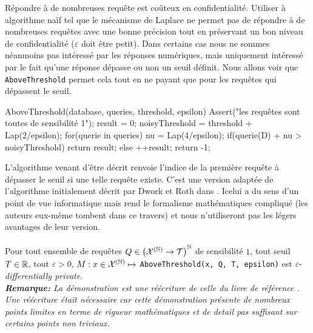 Répondre à de nombreuses requête est coûteux en confidentialité. Utiliser à algorithme naïf tel que le mécanisme de {\sc Laplace} \cite{10.1007/11681878_14} ne permet pas de répondre à de nombreuses requêtes avec une bonne précision tout en préservant un bon niveau de confidentialité (\(\varepsilon\) doit être petit). Dans certains cas nous ne sommes néanmoins pas intéressé par les réponses numériques, mais uniquement intéressé par le fait qu'une réponse dépasse ou non un seuil définit. Nous allons voir que \texttt{AboveThreshold} \cite{dwork2014the} permet cela tout en ne payant que pour les requêtes qui dépassent le seuil.

\label{AboveThreshold}
\begin{code}
    AboveThreshold(database, queries, threshold, epsilon){
        Assert("les requêtes sont toutes de sensibilité 1");
        result = 0;
        noisyThreshold = threshold + Lap(2/epsilon);
        for(querie in queries){
            nu = Lap(4/epsilon);
            if(querie(D) + nu > noisyThreshold)
                return result;
            else
                ++result;
        }
        return -1;
    }
\end{code}

L'algorithme venant d'être décrit renvoie l'indice de la première requête à dépasser le seuil si une telle requête existe. C'est une version adaptée de l'algorithme initialement décrit par {\sc Dwork } et {\sc Roth} dans \cite[page 57]{dwork2014the}. Icelui a du sens d'un point de vue informatique mais rend le formalisme mathématiques compliqué (les auteurs eux-même tombent dans ce travers) et nous n'utiliseront pas les légers avantages de leur version.\\
 
\theoreme{}\\
Pour tout ensemble de requêtes \(Q \in \left( \mathcal X^{(\mathbb{N})} \to  \mathcal T \right)^{\mathbb{N}}\) de sensibilité \(1\), tout seuil \(T \in \mathbb{R}\), tout \(\varepsilon > 0\), \(M : x \in \mathcal X^{(\mathbb{N})} \mapsto \) \texttt{AboveThreshold(x, Q, T, epsilon)} est \(\varepsilon\)-\textit{differentially private}.\\

\textit{\textbf{Remarque:} La démonstration est une réécriture de celle du livre de référence \cite[page57]{dwork2014the}. Une réécriture était nécessaire car cette démonstration présente de nombreux points limites en terme de rigueur mathématiques et de detail pas suffisant sur certains points non triviaux.}\\ 

